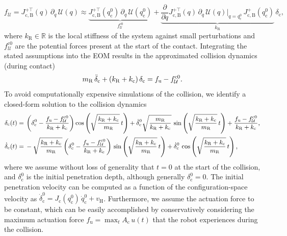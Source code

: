 \begin{equation}\label{eq:safetymetric:collision_potential_forces}
    f_{\mathcal{U}} = J_\mathrm{c,B}^{+\top}(q) \, \partial_{q} \, \mathcal{U}(q) \approx \underbrace{J_\mathrm{c,B}^{+\top}(q_{\mathrm{c}}^0) \, \partial_{q} \, \mathcal{U}(q_{\mathrm{c}}^0)}_{f_{\mathcal{U}}^{\mathrm{c}0}} + \underbrace{\frac{\partial}{\partial q} J_\mathrm{c,B}^{+\top}(q) \, \partial_{q} \, \mathcal{U}(q) \Big |_{q=q_{\mathrm{c}}^0} \,  J_\mathrm{c,B}^{+}(q_{\mathrm{c}}^0)}_{k_\mathrm{R}}  \, \delta_\mathrm{c},
\end{equation}
where $k_\mathrm{R} \in \mathbb{R}$ is the local stiffness of the system against small perturbations and $f_{\mathcal{U}}^{\mathrm{c}0}$ are the potential forces present at the start of the contact.
Integrating the stated assumptions into the \gls{EOM} results in the approximated collision dynamics (during contact)
\begin{equation}\label{eq:safetymetric:simplified_collision_dynamics}
    m_\mathrm{R} \, \Ddot{\delta}_\mathrm{c} + (k_\mathrm{R} + k_\mathrm{c}) \, \delta_\mathrm{c} = f_\mathrm{u} - f_{\mathcal{U}}^{\mathrm{c}0}.
\end{equation}
To avoid computationally expensive simulations of the collision, we identify a closed-form solution to the collision dynamics
\begin{equation}\small\label{eq:safetymetric:collision_dynamics_cfs}
\begin{split}
    \delta_\mathrm{c}(t) =& \: \left (\delta_\mathrm{c}^0-\frac{f_\mathrm{u}-f_{\mathcal{U}}^{\mathrm{c}0}}{k_\mathrm{R} + k_\mathrm{c}} \right ) \cos \left ( \sqrt{\frac{k_\mathrm{R} + k_\mathrm{c}}{m_\mathrm{R}}} \, t \right ) + \dot{\delta}_\mathrm{c}^0 \sqrt{\frac{m_\mathrm{R}}{k_\mathrm{R} + k_\mathrm{c}}} \, \sin \left ( \sqrt{\frac{k_\mathrm{R} + k_\mathrm{c}}{m_\mathrm{R}}} \, t \right ) + \frac{f_\mathrm{u}-f_{\mathcal{U}}^{\mathrm{c}0}}{k_\mathrm{R} + k_\mathrm{c}},\\
    \dot{\delta}_\mathrm{c}(t) =& \: -\sqrt{\frac{k_\mathrm{R} + k_\mathrm{c}}{m_\mathrm{R}}} \left (\delta_\mathrm{c}^0 - \frac{f_\mathrm{u}-f_{\mathcal{U}}^{\mathrm{c}0}}{k_\mathrm{R} + k_\mathrm{c}} \right ) \, \sin \left ( \sqrt{\frac{k_\mathrm{R} + k_\mathrm{c}}{m_\mathrm{R}}} \, t \right ) + \dot{\delta}_\mathrm{c}^0 \, \cos \left ( \sqrt{\frac{k_\mathrm{R} + k_\mathrm{c}}{m_\mathrm{R}}} \, t \right ),
\end{split}
\end{equation}
where we assume without loss of generality that $t=0$ at the start of the collision, and $\delta_\mathrm{c}^0$ is the initial penetration depth, although generally $\delta_\mathrm{c}^0 = 0$.
The initial penetration velocity can be computed as a function of the configuration-space velocity as $\dot{\delta}_\mathrm{c}^0 = J_\mathrm{c}(q_{\mathrm{c}}^0) \, \dot{q}_{\mathrm{c}}^0 + v_\mathrm{H}$.
Furthermore, we assume the actuation force to be constant, which can be easily accomplished by conservatively considering the maximum actuation force $f_\mathrm{u} = \max_t A_\mathrm{c} \, u(t)$ that the robot experiences during the collision.

